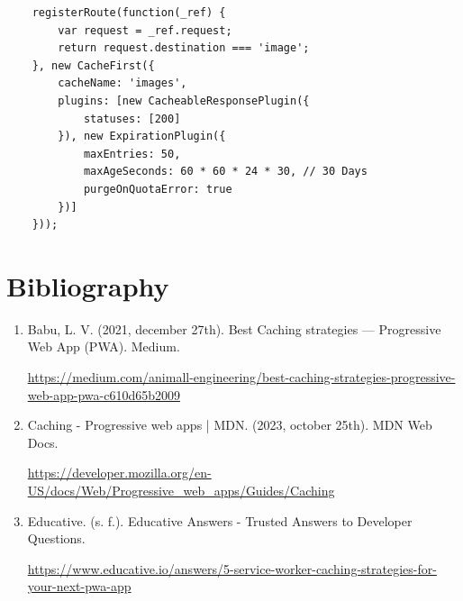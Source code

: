 \documentclass[12pt,a4paper]{article}
\begin{document}
    \begin{verbatim}
    registerRoute(function(_ref) {
        var request = _ref.request;
        return request.destination === 'image';
    }, new CacheFirst({
        cacheName: 'images',
        plugins: [new CacheableResponsePlugin({
            statuses: [200]
        }), new ExpirationPlugin({
            maxEntries: 50,
            maxAgeSeconds: 60 * 60 * 24 * 30, // 30 Days
            purgeOnQuotaError: true
        })]
    }));
    \end{verbatim}

\clearpage

	\section{Bibliography}

    \begin{enumerate}
    
      \item Babu, L. V. (2021, december 27th). Best Caching strategies — Progressive Web App (PWA). Medium. 
      
      \href{https://medium.com/animall-engineering/best-caching-strategies-progressive-web-app-pwa-c610d65b2009}{https://medium.com/animall-engineering/best-caching-strategies-progressive-web-app-pwa-c610d65b2009}

       \item Caching - Progressive web apps | MDN. (2023, october 25th). MDN Web Docs. 
      
      \href{https://developer.mozilla.org/en-US/docs/Web/Progressive_web_apps/Guides/Caching}{https://developer.mozilla.org/en-US/docs/Web/Progressive_web_apps/Guides/Caching}

      \item Educative. (s. f.). Educative Answers - Trusted Answers to Developer Questions.
      
      \href{https://www.educative.io/answers/5-service-worker-caching-strategies-for-your-next-pwa-app}{https://www.educative.io/answers/5-service-worker-caching-strategies-for-your-next-pwa-app}
      
    \end{enumerate}
	
	
\end{document}
